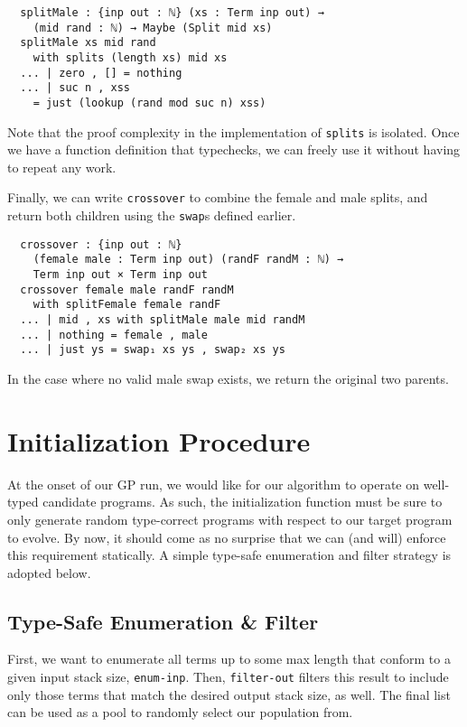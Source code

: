 \documentclass[runningheads,a4paper]{llncs}
\begin{document}
\begin{verbatim}
  splitMale : {inp out : ℕ} (xs : Term inp out) →
    (mid rand : ℕ) → Maybe (Split mid xs)
  splitMale xs mid rand
    with splits (length xs) mid xs
  ... | zero , [] = nothing
  ... | suc n , xss
    = just (lookup (rand mod suc n) xss)
\end{verbatim}

Note that the proof complexity in the implementation of
\texttt{splits} is isolated. Once we have a function definition that
typechecks, we can freely use it without having to repeat any work.

Finally, we can write \texttt{crossover} to combine the female and
male splits, and return both children using the \texttt{swap}s defined
earlier.

\begin{verbatim}
  crossover : {inp out : ℕ}
    (female male : Term inp out) (randF randM : ℕ) →
    Term inp out × Term inp out
  crossover female male randF randM
    with splitFemale female randF
  ... | mid , xs with splitMale male mid randM
  ... | nothing = female , male
  ... | just ys = swap₁ xs ys , swap₂ xs ys
\end{verbatim}

In the case where no valid male swap exists, we return the original
two parents.

\section{Initialization Procedure}

At the onset of our GP run, we would like for our algorithm to operate
on well-typed candidate programs. As such, the initialization function
must be sure to only generate random type-correct programs with
respect to our target program to evolve. By now, it should come as no
surprise that we can (and will) enforce this requirement statically. A
simple type-safe enumeration and filter strategy is adopted below.

\subsection{Type-Safe Enumeration \& Filter}

First, we want to enumerate all terms up to some max length that
conform to a given input stack size, \texttt{enum-inp}. Then,
\texttt{filter-out} filters this result to include only those terms that
match the desired output stack size, as well. The final list can be
used as a pool to randomly select our population from.
\end{document}
